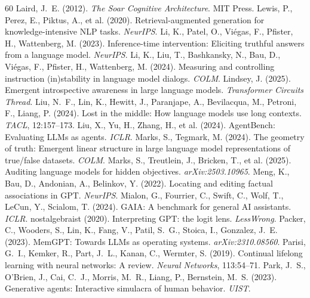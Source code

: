 \documentclass{article}
\begin{document}
\begin{thebibliography}{60}
 Laird, J.~E. (2012). \emph{The Soar Cognitive Architecture}. MIT Press.
 Lewis, P., Perez, E., Piktus, A., et al. (2020). Retrieval-augmented generation for knowledge-intensive NLP tasks. \emph{NeurIPS}.
 Li, K., Patel, O., Vi\'egas, F., Pfister, H., Wattenberg, M. (2023). Inference-time intervention: Eliciting truthful answers from a language model. \emph{NeurIPS}.
 Li, K., Liu, T., Bashkansky, N., Bau, D., Vi\'egas, F., Pfister, H., Wattenberg, M. (2024). Measuring and controlling instruction (in)stability in language model dialogs. \emph{COLM}.
 Lindsey, J. (2025). Emergent introspective awareness in large language models. \emph{Transformer Circuits Thread}.
 Liu, N.~F., Lin, K., Hewitt, J., Paranjape, A., Bevilacqua, M., Petroni, F., Liang, P. (2024). Lost in the middle: How language models use long contexts. \emph{TACL}, 12:157--173.
 Liu, X., Yu, H., Zhang, H., et al. (2024). AgentBench: Evaluating LLMs as agents. \emph{ICLR}.
 Marks, S., Tegmark, M. (2024). The geometry of truth: Emergent linear structure in large language model representations of true/false datasets. \emph{COLM}.
 Marks, S., Treutlein, J., Bricken, T., et al. (2025). Auditing language models for hidden objectives. \emph{arXiv:2503.10965}.
 Meng, K., Bau, D., Andonian, A., Belinkov, Y. (2022). Locating and editing factual associations in GPT. \emph{NeurIPS}.
 Mialon, G., Fourrier, C., Swift, C., Wolf, T., LeCun, Y., Scialom, T. (2024). GAIA: A benchmark for general AI assistants. \emph{ICLR}.
 nostalgebraist (2020). Interpreting GPT: the logit lens. \emph{LessWrong}.
 Packer, C., Wooders, S., Lin, K., Fang, V., Patil, S.~G., Stoica, I., Gonzalez, J.~E. (2023). MemGPT: Towards LLMs as operating systems. \emph{arXiv:2310.08560}.
 Parisi, G.~I., Kemker, R., Part, J.~L., Kanan, C., Wermter, S. (2019). Continual lifelong learning with neural networks: A review. \emph{Neural Networks}, 113:54--71.
 Park, J.~S., O'Brien, J., Cai, C.~J., Morris, M.~R., Liang, P., Bernstein, M.~S. (2023). Generative agents: Interactive simulacra of human behavior. \emph{UIST}.

\end{thebibliography}
\end{document}
